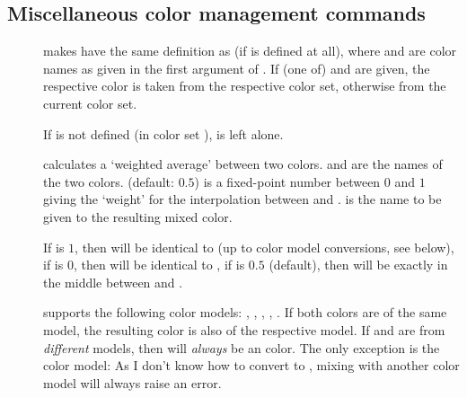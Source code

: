 \documentclass[12pt]{scrartcl}
\let\newslide=\relax
\begin{document}
  \subsection{Miscellaneous color management commands}\label{Sec:MiscColorCommands}
  \begin{description}
  \item[]
    \indexmacro{} makes
     have the same definition as  (if  is defined at all), where 
    and  are color names as given in the first argument of .  If (one of)
     and  are given, the respective color is taken from the respective color set, otherwise from
    the current color set.

    If  is not defined (in color set ),  is left alone.

    \newslide

  \item[]
     calculates a
    `weighted average' between two colors.  and  are the names of the two colors. 
    (default: $0.5$) is a fixed-point number between $0$ and $1$ giving the `weight' for the interpolation between
     and .  is the name to be given to the resulting mixed color.

    If  is $1$, then  will be identical to  (up to color model conversions, see
    below), if  is $0$, then  will be identical to , if  is $0.5$
    (default), then  will be exactly in the middle between  and .

     supports the following color models: , , , ,
    . If both colors are of the same model, the resulting color is also of the respective model. If
     and  are from \emph{different} models, then  will \emph{always} be an 
    color. The only exception is the  color model: As I don't know how to convert  to ,
    mixing  with another color model will always raise an error.

    \newslide


\end{description}
\end{document}
